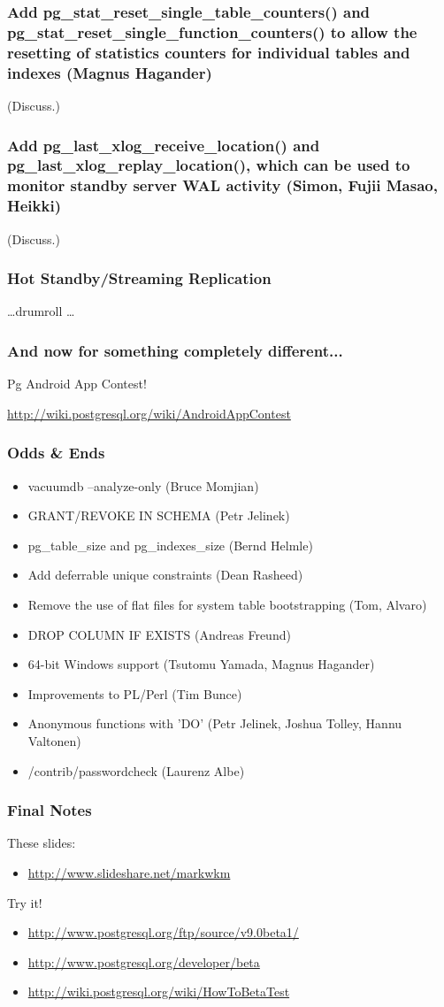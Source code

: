 \documentclass{beamer}
\begin{document}
\frame
{
  \frametitle{Add pg\_stat\_reset\_single\_table\_counters() 
  and pg\_stat\_reset\_single\_function\_counters() 
  to allow the resetting of statistics counters for 
  individual tables and indexes (Magnus Hagander)}

  (Discuss.)
}

\frame
{
  \frametitle{Add pg\_last\_xlog\_receive\_location() 
  and pg\_last\_xlog\_replay\_location(), which can be used to monitor 
  standby server WAL activity (Simon, Fujii Masao, Heikki)}

  (Discuss.)
}

\frame
{
  \frametitle{Hot Standby/Streaming Replication}

  \ldots drumroll \ldots
}

\frame
{
  \frametitle{And now for something completely different...}

  \begin{center}
  Pg Android App Contest!
  \end{center}
  \url{http://wiki.postgresql.org/wiki/AndroidAppContest}
}

\frame
{
  \frametitle{Odds \& Ends}
  \begin{itemize}
  \item[] vacuumdb --analyze-only (Bruce Momjian)
  \item[] GRANT/REVOKE IN SCHEMA (Petr Jelinek)
  \item[] pg\_table\_size and pg\_indexes\_size (Bernd Helmle)
  \item[] Add deferrable unique constraints (Dean Rasheed)
  \item[] Remove the use of flat files for system table bootstrapping (Tom, Alvaro)
  \item[] DROP COLUMN IF EXISTS (Andreas Freund)
  \item[] 64-bit Windows support (Tsutomu Yamada, Magnus Hagander)
  \item[] Improvements to PL/Perl (Tim Bunce)
  \item[] Anonymous functions with 'DO' (Petr Jelinek, Joshua Tolley, Hannu Valtonen)
  \item[] /contrib/passwordcheck (Laurenz Albe)
  \end{itemize}
}

\frame
{
  \frametitle{Final Notes}

  These slides:\\
  \begin{itemize}
  \item[] \url{http://www.slideshare.net/markwkm}
  \end{itemize}

  Try it!\\
  \begin{itemize}
  \item[] \url{http://www.postgresql.org/ftp/source/v9.0beta1/}
  \item[] \url{http://www.postgresql.org/developer/beta}
  \item[] \url{http://wiki.postgresql.org/wiki/HowToBetaTest}
  \end{itemize}
}
\end{document}
